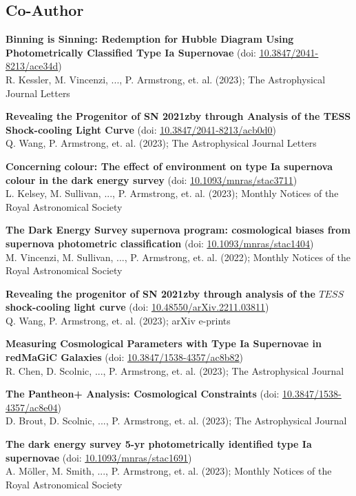 \documentclass[letterpaper,11pt]{article}
\newcommand*\lbreak{\\[\baselineskip]}
\newcommand{\publicationElement}[5]{%
    \textbf{{#1}} ({#4})\\{#3}; {#2}\lbreak{}
}
\begin{document}
    \subsection{Co-Author}

        \publicationElement{Binning is Sinning: Redemption for Hubble Diagram Using Photometrically Classified Type Ia Supernovae}{The Astrophysical Journal Letters}{R. Kessler, M. Vincenzi, ..., P. Armstrong, et. al. (2023)}{doi: \href{https://doi.org/10.3847/2041-8213/ace34d}{\underline{10.3847/2041-8213/ace34d}}}{}
        \publicationElement{Revealing the Progenitor of SN 2021zby through Analysis of the TESS Shock-cooling Light Curve}{The Astrophysical Journal Letters}{Q. Wang, P. Armstrong, et. al. (2023)}{doi: \href{https://doi.org/10.3847/2041-8213/acb0d0}{\underline{10.3847/2041-8213/acb0d0}}}{}
        \publicationElement{Concerning colour: The effect of environment on type Ia supernova colour in the dark energy survey}{Monthly Notices of the Royal Astronomical Society}{L. Kelsey, M. Sullivan, ..., P. Armstrong, et. al. (2023)}{doi: \href{https://doi.org/10.1093/mnras/stac3711}{\underline{10.1093/mnras/stac3711}}}{}
        \publicationElement{The Dark Energy Survey supernova program: cosmological biases from supernova photometric classification}{Monthly Notices of the Royal Astronomical Society}{M. Vincenzi, M. Sullivan, ..., P. Armstrong, et. al. (2022)}{doi: \href{https://doi.org/10.1093/mnras/stac1404}{\underline{10.1093/mnras/stac1404}}}{}
        \publicationElement{Revealing the progenitor of SN 2021zby through analysis of the $TESS$ shock-cooling light curve}{arXiv e-prints}{Q. Wang, P. Armstrong, et. al. (2023)}{doi: \href{https://doi.org/10.48550/arXiv.2211.03811}{\underline{10.48550/arXiv.2211.03811}}}{}
        \publicationElement{Measuring Cosmological Parameters with Type Ia Supernovae in redMaGiC Galaxies}{The Astrophysical Journal}{R. Chen, D. Scolnic, ..., P. Armstrong, et. al. (2023)}{doi: \href{https://doi.org/10.3847/1538-4357/ac8b82}{\underline{10.3847/1538-4357/ac8b82}}}{}
        \publicationElement{The Pantheon+ Analysis: Cosmological Constraints}{The Astrophysical Journal}{D. Brout, D. Scolnic, ..., P. Armstrong, et. al. (2023)}{doi: \href{https://doi.org/10.3847/1538-4357/ac8e04}{\underline{10.3847/1538-4357/ac8e04}}}{}
        \publicationElement{The dark energy survey 5-yr photometrically identified type Ia supernovae}{Monthly Notices of the Royal Astronomical Society}{A. Möller, M. Smith, ..., P. Armstrong, et. al. (2023)}{doi: \href{https://doi.org/10.1093/mnras/stac1691}{\underline{10.1093/mnras/stac1691}}}{}
\end{document}

